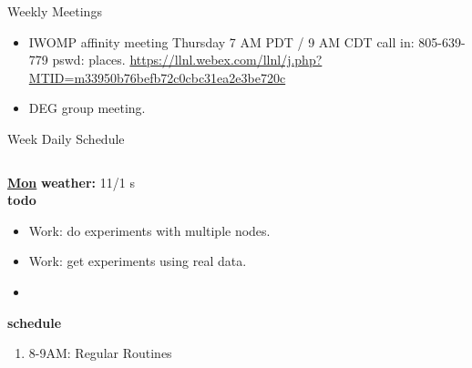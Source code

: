 \begin{columns}
\begin{column}{0.5\columnwidth}
\begin{columns}
\begin{column}{0.6\linewidth}
      \begin{block}{Weekly Meetings}
        \begin{itemize}
          \tiny \item \tiny IWOMP affinity meeting Thursday 7 AM PDT / 9 AM
          CDT call in: 805-639-779 pswd: places. \url{https://llnl.webex.com/llnl/j.php?MTID=m33950b76befb72c0cbc31ea2e3be720c}
        \item \tiny DEG group meeting.  
        \end{itemize}
      \end{block} 
      \begin{block}{Week Daily Schedule}
        \begin{columns}
          \begin{column}{0.14\textwidth}{\small \underline{\bf Mon}}
            {\tiny \bf {\tiny weather:} } {\tiny 11/1 s} \\ 
            {\tiny \bf {\tiny todo}}\\ 
            \begin{itemize}
              \tiny \item \tiny Work: do experiments with multiple nodes. 
            \item \tiny Work: get experiments using real data.  
            \item \tiny 
            \end{itemize}
                {\small  \bf schedule}\\
                \begin{enumerate} 
                  \tiny \item \tiny 8-9AM: Regular Routines 
                \end{enumerate}
          \end{column}


\end{columns}
\end{block}
\end{column}
\end{columns}
\end{column}
\end{columns}
